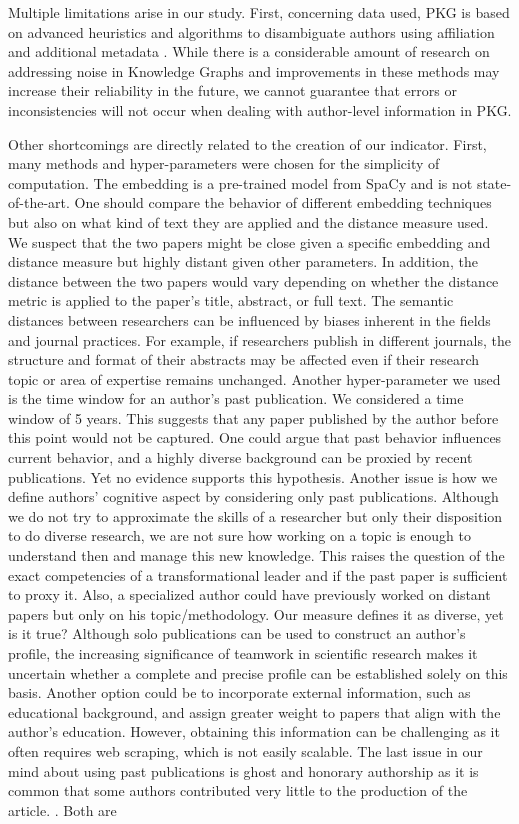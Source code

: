 Multiple limitations arise in our study. First, concerning data used, PKG is based on advanced heuristics and algorithms to disambiguate authors using affiliation and additional metadata \cite{xu2020building}. While there is a considerable amount of research on addressing noise in Knowledge Graphs \citep{fasoulis2020error} and improvements in these methods may increase their reliability in the future, we cannot guarantee that errors or inconsistencies will not occur when dealing with author-level information in PKG. 

Other shortcomings are directly related to the creation of our indicator. First, many methods and hyper-parameters were chosen for the simplicity of computation. The embedding is a pre-trained model from SpaCy and is not state-of-the-art. One should compare the behavior of different embedding techniques but also on what kind of text they are applied and the distance measure used. We suspect that the two papers might be close given a specific embedding and distance measure but highly distant given other parameters. In addition, the distance between the two papers would vary depending on whether the distance metric is applied to the paper's title, abstract, or full text. The semantic distances between researchers can be influenced by biases inherent in the fields and journal practices. For example, if researchers publish in different journals, the structure and format of their abstracts may be affected even if their research topic or area of expertise remains unchanged. Another hyper-parameter we used is the time window for an author's past publication. We considered a time window of 5 years. This suggests that any paper published by the author before this point would not be captured. One could argue that past behavior influences current behavior, and a highly diverse background can be proxied by recent publications. Yet no evidence supports this hypothesis. Another issue is how we define authors' cognitive aspect by considering only past publications. Although we do not try to approximate the skills of a researcher but only their disposition to do diverse research, we are not sure how working on a topic is enough to understand then and manage this new knowledge. This raises the question of the exact competencies of a transformational leader and if the past paper is sufficient to proxy it. Also, a specialized author could have previously worked on distant papers but only on his topic/methodology. Our measure defines it as diverse, yet is it true? Although solo publications can be used to construct an author's profile, the increasing significance of teamwork in scientific research makes it uncertain whether a complete and precise profile can be established solely on this basis. Another option could be to incorporate external information, such as educational background, and assign greater weight to papers that align with the author's education. However, obtaining this information can be challenging as it often requires web scraping, which is not easily scalable. The last issue in our mind about using past publications is ghost and honorary authorship as it is common that some authors contributed very little to the production of the article. \citep{sugimoto2018measuring,pruschak2022and}. Both are 